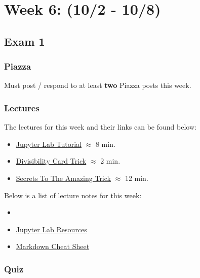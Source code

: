 \clearpage
\chapter{Week 6: (10/2 - 10/8)}

\section{Exam 1}

\subsection{Piazza}

Must post / respond to at least \textbf{two} Piazza posts this week.  

\subsection{Lectures}

The lectures for this week and their links can be found below:

\begin{itemize}
    \item \href{https://applied.cs.colorado.edu/mod/hvp/view.php?id=51653}{Jupyter Lab Tutorial} $\approx$ 8 min.
    \item \href{https://www.youtube.com/watch?v=7zX7bZl4SLY}{Divisibility Card Trick} $\approx$ 2 min.
    \item \href{https://www.youtube.com/watch?v=5E3SIbS_uLU}{Secrets To The Amazing Trick} $\approx$ 12 min.
\end{itemize}

\noindent Below is a list of lecture notes for this week:

\begin{itemize}
    \item {}
    \item \href{https://www.colorado.edu/cs/students/computing-resources-students}{Jupyter Lab Resources}
    \item \href{https://github.com/adam-p/markdown-here/wiki/Markdown-Cheatsheet}{Markdown Cheat Sheet}
\end{itemize}

\subsection{Quiz}

